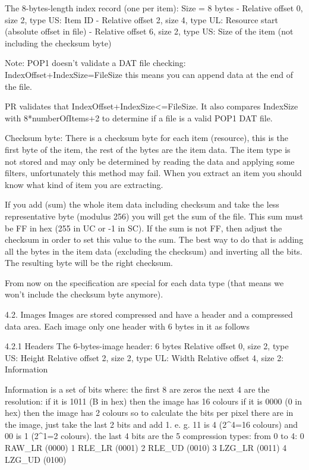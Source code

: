  The 8-bytes-length index record (one per item): Size = 8 bytes
  - Relative offset 0, size 2, type US: Item ID
  - Relative offset 2, size 4, type UL: Resource start
           (absolute offset in file)
  - Relative offset 6, size 2, type US: Size of the item
           (not including the checksum byte)

 Note:
  POP1 doesn't validate a DAT file checking:
  IndexOffset+IndexSize=FileSize
  this means you can append data at the end of the file.

  PR validates that IndexOffset+IndexSize<=FileSize.
 It also compares IndexSize with 8*numberOfItems+2 to determine if a file
  is a valid POP1 DAT file.

 Checksum byte:
 There is a checksum byte for each item (resource), this is the first byte
 of the item, the rest of the bytes are the item data. The item type is not
 stored and may only be determined by reading the data and applying some
 filters, unfortunately this method may fail. When you extract an item you
 should know what kind of item you are extracting.

 If you add (sum) the whole item data including checksum and take the less
 representative byte (modulus 256) you will get the sum of the file. This
 sum must be FF in hex (255 in UC or -1 in SC). If the sum is not FF, then
 adjust the checksum in order to set this value to the sum. The best way
 to do that is adding all the bytes in the item data (excluding the
 checksum) and inverting all the bits. The resulting byte will be the
 right checksum.

 From now on the specification are special for each data type (that means
 we won't include the checksum byte anymore).

4.2. Images
 Images are stored compressed and have a header and a compressed data area.
 Each image only one header with 6 bytes in it as follows

4.2.1 Headers
 The 6-bytes-image header: 6 bytes
  Relative offset 0, size 2, type US: Height
  Relative offset 2, size 2, type UL: Width
  Relative offset 4, size 2: Information

 Information is a set of bits where:
  the first 8 are zeros
  the next 4 are the resolution:
   if it is 1011 (B in hex) then the image has 16 colours
   if it is 0000 (0 in hex) then the image has 2 colours
   so to calculate the bits per pixel there are in the image, just take the
   last 2 bits and add 1. e. g. 11 is 4 (2^4=16 colours) and
  00 is 1 (2^1=2 colours).
  the last 4 bits are the 5 compression types:
   from 0 to 4:
   0 RAW_LR (0000)
   1 RLE_LR (0001)
   2 RLE_UD (0010)
   3 LZG_LR (0011)
   4 LZG_UD (0100)

